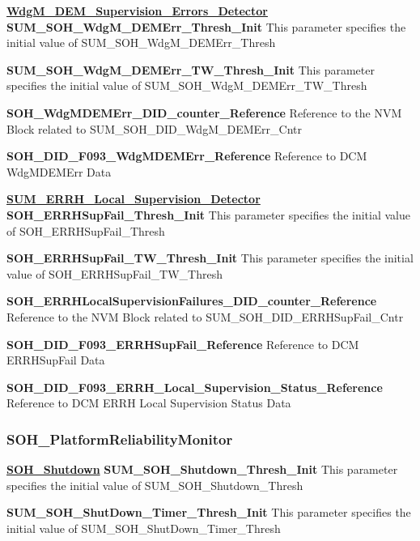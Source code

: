 \textbf{\underline{WdgM\_DEM\_Supervision\_Errors\_Detector}}\newline
\textbf{SUM\_SOH\_WdgM\_DEMErr\_Thresh\_Init}\newline
This parameter specifies the initial value of SUM\_SOH\_WdgM\_DEMErr\_Thresh

\textbf{SUM\_SOH\_WdgM\_DEMErr\_TW\_Thresh\_Init}\newline
This parameter specifies the initial value of SUM\_SOH\_WdgM\_DEMErr\_TW\_Thresh

\textbf{SOH\_WdgMDEMErr\_DID\_counter\_Reference}\newline
Reference to the NVM Block related to SUM\_SOH\_DID\_WdgM\_DEMErr\_Cntr

\textbf{SOH\_DID\_F093\_WdgMDEMErr\_Reference}\newline
Reference to DCM WdgMDEMErr Data

\textbf{\underline{SUM\_ERRH\_Local\_Supervision\_Detector}}\newline
\textbf{SOH\_ERRHSupFail\_Thresh\_Init}\newline
This parameter specifies the initial value of SOH\_ERRHSupFail\_Thresh

\textbf{SOH\_ERRHSupFail\_TW\_Thresh\_Init}\newline
This parameter specifies the initial value of SOH\_ERRHSupFail\_TW\_Thresh

\textbf{SOH\_ERRHLocalSupervisionFailures\_DID\_counter\_Reference}\newline
Reference to the NVM Block related to SUM\_SOH\_DID\_ERRHSupFail\_Cntr

\textbf{SOH\_DID\_F093\_ERRHSupFail\_Reference}\newline
Reference to DCM ERRHSupFail Data

\textbf{SOH\_DID\_F093\_ERRH\_Local\_Supervision\_Status\_Reference}\newline
Reference to DCM ERRH Local Supervision Status Data

\subsubsection{SOH\_PlatformReliabilityMonitor}

\textbf{\underline{SOH\_Shutdown}}\newline
\textbf{SUM\_SOH\_Shutdown\_Thresh\_Init}\newline
This parameter specifies the initial value of SUM\_SOH\_Shutdown\_Thresh

\textbf{SUM\_SOH\_ShutDown\_Timer\_Thresh\_Init}\newline
This parameter specifies the initial value of SUM\_SOH\_ShutDown\_Timer\_Thresh

